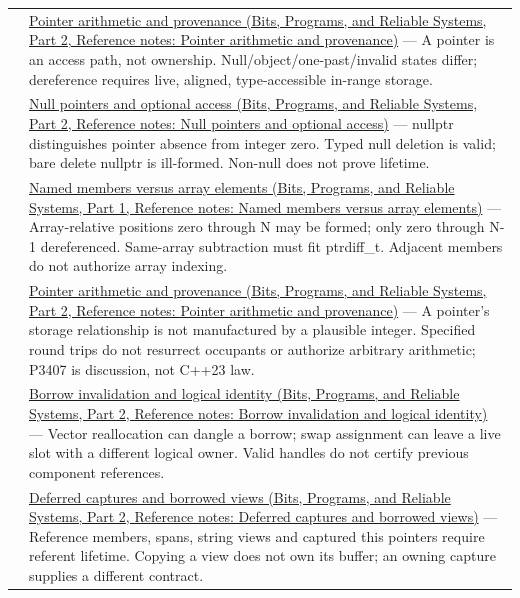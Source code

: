{\begin{longtable}[]{@{}
  >{\raggedright\arraybackslash}p{}
  >{\raggedright\arraybackslash}p{}@{}}
117 & \href{../01-Bits-Programs-and-Reliable-Systems-P02/main.pdf\#nameddest=appendix-6af5921bc853}{Pointer arithmetic and provenance (Bits, Programs, and Reliable Systems, Part 2, Reference notes: Pointer arithmetic and provenance)} --- A pointer is an access path, not ownership. Null/object/one-past/invalid states differ; dereference requires live, aligned, type-accessible in-range storage. \\
118 & \href{../01-Bits-Programs-and-Reliable-Systems-P02/main.pdf\#nameddest=appendix-afae48c31800}{Null pointers and optional access (Bits, Programs, and Reliable Systems, Part 2, Reference notes: Null pointers and optional access)} --- nullptr distinguishes pointer absence from integer zero. Typed null deletion is valid; bare delete nullptr is ill-formed. Non-null does not prove lifetime. \\
119 & \href{../01-Bits-Programs-and-Reliable-Systems-P01/main.pdf\#nameddest=appendix-3f7e15effba6}{Named members versus array elements (Bits, Programs, and Reliable Systems, Part 1, Reference notes: Named members versus array elements)} --- Array-relative positions zero through N may be formed; only zero through N-1 dereferenced. Same-array subtraction must fit ptrdiff\_t. Adjacent members do not authorize array indexing. \\
120 & \href{../01-Bits-Programs-and-Reliable-Systems-P02/main.pdf\#nameddest=appendix-6af5921bc853}{Pointer arithmetic and provenance (Bits, Programs, and Reliable Systems, Part 2, Reference notes: Pointer arithmetic and provenance)} --- A pointer's storage relationship is not manufactured by a plausible integer. Specified round trips do not resurrect occupants or authorize arbitrary arithmetic; P3407 is discussion, not C++23 law. \\
121 & \href{../01-Bits-Programs-and-Reliable-Systems-P02/main.pdf\#nameddest=appendix-f9b8b9188c7f}{Borrow invalidation and logical identity (Bits, Programs, and Reliable Systems, Part 2, Reference notes: Borrow invalidation and logical identity)} --- Vector reallocation can dangle a borrow; swap assignment can leave a live slot with a different logical owner. Valid handles do not certify previous component references. \\
122 & \href{../01-Bits-Programs-and-Reliable-Systems-P02/main.pdf\#nameddest=appendix-aea529eb5175}{Deferred captures and borrowed views (Bits, Programs, and Reliable Systems, Part 2, Reference notes: Deferred captures and borrowed views)} --- Reference members, spans, string views and captured this pointers require referent lifetime. Copying a view does not own its buffer; an owning capture supplies a different contract. \\

\end{longtable}}
